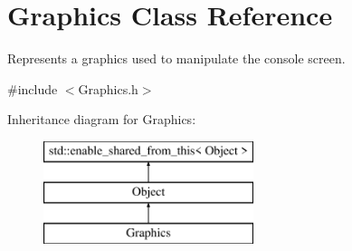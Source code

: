 \hypertarget{class_graphics}{}\section{Graphics Class Reference}
\label{class_graphics}


Represents a graphics used to manipulate the console screen.  




{\ttfamily \#include $<$Graphics.\+h$>$}

Inheritance diagram for Graphics\+:\begin{figure}[H]
\begin{center}
\leavevmode
\includegraphics[height=3.000000cm]{class_graphics}
\end{center}
\end{figure}
